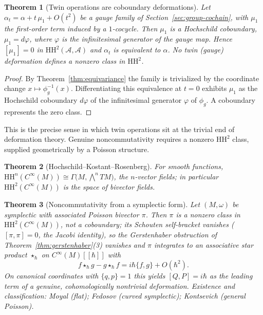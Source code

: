 \documentclass[11pt,a4paper,openany]{book}
\theoremstyle{plain}
\newtheorem{theorem}{Theorem}[chapter]
\theoremstyle{definition}
\begin{document}
\begin{theorem}[Twin operations are coboundary deformations]\label{thm:twin-coboundary}
Let $\alpha_t=\alpha+t\,\mu_1+O(t^2)$ be a gauge family of Section~\ref{sec:group-cochain}, with $\mu_1$ the first-order term induced by a $1$-cocycle. Then $\mu_1$ is a Hochschild \emph{coboundary}, $\mu_1=d\varphi$, where $\varphi$ is the infinitesimal generator of the gauge map. Hence $[\mu_1]=0$ in $\mathrm{HH}^2(\mathcal{A},\mathcal{A})$ and $\alpha_t$ is equivalent to $\alpha$. No twin (gauge) deformation defines a nonzero class in $\mathrm{HH}^2$.
\end{theorem}

\begin{proof}
By Theorem~\ref{thm:equivariance} the family is trivialized by the coordinate change $x\mapsto\phi_g^{-1}(x)$. Differentiating this equivalence at $t=0$ exhibits $\mu_1$ as the Hochschild coboundary $d\varphi$ of the infinitesimal generator $\varphi$ of $\phi_g$. A coboundary represents the zero class.
\end{proof}

This is the precise sense in which twin operations sit at the trivial end of deformation theory. Genuine noncommutativity requires a nonzero $\mathrm{HH}^2$ class, supplied geometrically by a Poisson structure.

\begin{theorem}[Hochschild--Kostant--Rosenberg]\label{thm:hkr}
For smooth functions, $\mathrm{HH}^n(C^\infty(M))\cong\Gamma\big(M,\textstyle\bigwedge^n TM\big)$, the $n$-vector fields; in particular $\mathrm{HH}^2(C^\infty(M))$ is the space of bivector fields.
\end{theorem}

\begin{theorem}[Noncommutativity from a symplectic form]\label{thm:moyal-origin}
Let $(M,\omega)$ be symplectic with associated Poisson bivector $\pi$. Then $\pi$ is a nonzero class in $\mathrm{HH}^2(C^\infty(M))$, not a coboundary; its Schouten self-bracket vanishes ($[\pi,\pi]=0$, the Jacobi identity), so the Gerstenhaber obstruction of Theorem~\ref{thm:gerstenhaber}(3) vanishes and $\pi$ integrates to an associative star product $\star_\hbar$ on $C^\infty(M)[[\hbar]]$ with
\[
f\star_\hbar g - g\star_\hbar f = i\hbar\{f,g\}+O(\hbar^2).
\]
On canonical coordinates with $\{q,p\}=1$ this yields $[Q,P]=i\hbar$ as the leading term of a genuine, cohomologically nontrivial deformation. Existence and classification: Moyal (flat); Fedosov (curved symplectic); Kontsevich (general Poisson).
\end{theorem}
\end{document}
